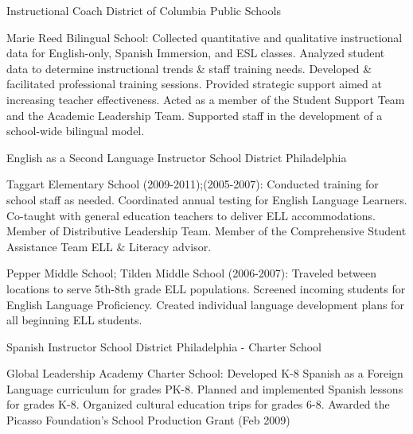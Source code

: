 \documentclass[]{scrartcl}
\begin{document}
\begin{cleanCV}
{Instructional Coach}
{District of Columbia Public Schools}

\JobDesc
{Marie Reed Bilingual School: }
{Collected quantitative and qualitative instructional data for English-only, Spanish Immersion, and ESL classes. Analyzed student data to determine instructional trends \& staff training needs. Developed \& facilitated professional training sessions. Provided strategic support aimed at increasing teacher effectiveness. Acted as a member of the  Student Support Team and the Academic Leadership Team. Supported staff in the development of a school-wide bilingual model.}


{English as a Second Language Instructor}
{School District Philadelphia}

\JobDesc
{Taggart Elementary School (2009-2011);(2005-2007): }
{Conducted training for school staff as needed. Coordinated annual testing for English Language Learners. Co-taught with general education teachers to deliver ELL accommodations. Member of Distributive Leadership Team. Member of the Comprehensive Student Assistance Team ELL \& Literacy advisor.}

\JobDesc
{Pepper Middle School; Tilden Middle School (2006-2007): }
{Traveled between locations to serve 5th-8th grade ELL populations. 
Screened incoming students for English Language Proficiency.
Created individual language development plans for all beginning ELL students.}

  
{Spanish Instructor}
{School District Philadelphia - Charter School}

\JobDesc
{Global Leadership Academy Charter School: }
{Developed K-8 Spanish as a Foreign Language curriculum for grades PK-8.
Planned and implemented Spanish lessons for grades K-8.
Organized cultural education trips for grades 6-8. 
Awarded the Picasso Foundation's School Production Grant (Feb 2009)}





\end{cleanCV}
\end{document}
